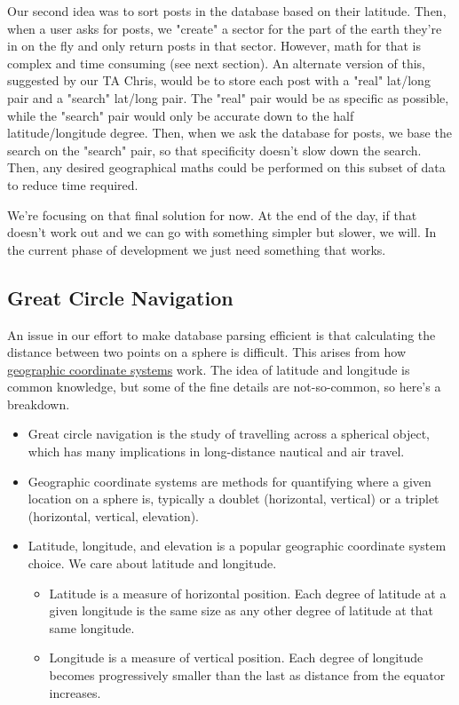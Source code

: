 \documentclass[draftclsnofoot, onecolumn, letterpaper,10pt,compsoc]{IEEEtran}
\begin{document}
Our second idea was to sort posts in the database based on their latitude. Then, when a user asks for posts, we "create" a sector for the part of the earth they're in on the fly and only return posts in that sector. However, math for that is complex and time consuming (see next section). An alternate version of this, suggested by our TA Chris, would be to store each post with a "real" lat/long pair and a "search" lat/long pair. The "real" pair would be as specific as possible, while the "search" pair would only be accurate down to the half latitude/longitude degree. Then, when we ask the database for posts, we base the search on the "search" pair, so that specificity doesn't slow down the search. Then, any desired geographical maths could be performed on this subset of data to reduce time required. 

We're focusing on that final solution for now. At the end of the day, if that doesn't work out and we can go with something simpler but slower, we will. In the current phase of development we just need something that works. 

\subsection{Great Circle Navigation}

An issue in our effort to make database parsing efficient is that calculating the distance between two points on a sphere is difficult. This arises from how \href{https://en.wikipedia.org/wiki/Geographic_coordinate_system}{geographic coordinate systems} work. The idea of latitude and longitude is common knowledge, but some of the fine details are not-so-common, so here's a breakdown. 

\begin{itemize}
    \item Great circle navigation is the study of travelling across a spherical object, which has many implications in long-distance nautical and air travel.
    \item Geographic coordinate systems are methods for quantifying where a given location on a sphere is, typically a doublet (horizontal, vertical) or a triplet (horizontal, vertical, elevation).
    \item Latitude, longitude, and elevation is a popular geographic coordinate system choice. We care about latitude and longitude. 
    \begin{itemize}
        \item Latitude is a measure of horizontal position. Each degree of latitude at a given longitude is the same size as any other degree of latitude at that same longitude. 
        \item Longitude is a measure of vertical position. Each degree of longitude becomes progressively smaller than the last as distance from the equator increases. 
    \end{itemize}
\end{itemize}
\end{document}
